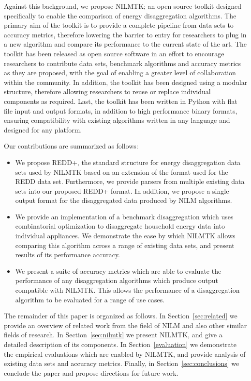 \documentclass{sig-alternate}
\newcommand{\secref}[1]{Section~\ref{#1}}
\begin{document}
Against this background, we propose NILMTK; an open source toolkit designed specifically to enable the comparison of energy disaggregation algorithms. The primary aim of the toolkit is to provide a complete pipeline from data sets to accuracy metrics, therefore lowering the barrier to entry for researchers to plug in a new algorithm and compare its performance to the current state of the art. The toolkit has been released as open source software in an effort to encourage researchers to contribute data sets, benchmark algorithms and accuracy metrics as they are proposed, with the goal of enabling a greater level of collaboration within the community. In addition, the toolkit has been designed using a modular structure, therefore allowing researchers to reuse or replace individual components as required. Last, the toolkit has been written in Python with flat file input and output formats, in addition to high performance binary formats, ensuring compatibility with existing algorithms written in any language and designed for any platform.

Our contributions are summarized as follows:\begin{itemize}
\item We propose REDD+, the standard structure for energy disaggregation data sets used by NILMTK based on an extension of the format used for the REDD data set. Furthermore, we provide parsers from multiple existing data sets into our proposed REDD+ format. In addition, we propose a single output format for the disaggregated data produced by NILM algorithms.
\item We provide an implementation of a benchmark disaggregation which uses combinatorial optimization to disaggregate household energy data into individual appliances. We demonstrate the ease by which NILMTK allows comparing this algorithm across a range of existing data sets, and present results of its performance accuracy.
\item We present a suite of accuracy metrics which are able to evaluate the performance of any disaggregation algorithms which produce output compatible with NILMTK. This allows the performance of a disaggregation algorithm to be evaluated for a range of use cases.
\end{itemize}
The remainder of this paper is organized as follows. In \secref{sec:related} we provide an overview of related work from the field of NILM and also other similar fields of research. In \secref{sec:nilmtk} we present NILMTK, and give a detailed description of its components. In \secref{evaluation} we demonstrate the empirical evaluations which are enabled by NILMTK, and provide analysis of existing data sets and accuracy metrics. Finally, in \secref{sec:conclusions} we conclude the paper and propose directions for future work.
\end{document}
